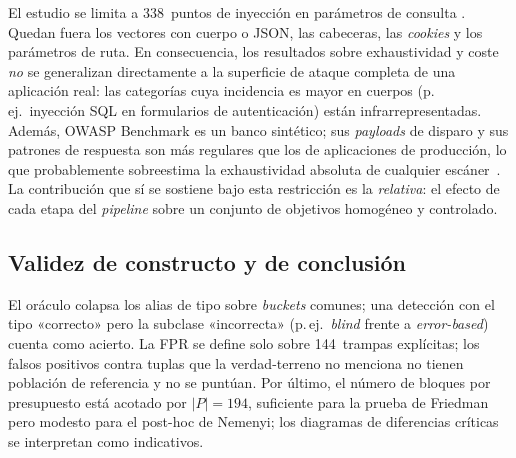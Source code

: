 El estudio se limita a \num{338}~puntos de inyección en parámetros de consulta
. Quedan fuera los vectores  con cuerpo
 o JSON, las cabeceras, las
\emph{cookies} y los parámetros de ruta. En consecuencia, los resultados sobre
exhaustividad y coste \emph{no} se generalizan directamente a la superficie de
ataque completa de una aplicación real: las categorías cuya incidencia es mayor
en cuerpos  (p.\,ej.\ inyección SQL en formularios de autenticación)
están infrarrepresentadas. Además, OWASP Benchmark es un banco sintético; sus
\emph{payloads} de disparo y sus patrones de respuesta son más regulares que
los de aplicaciones de producción, lo que probablemente sobreestima la
exhaustividad absoluta de cualquier escáner~\cite{doupe2010johnny}. La
contribución que sí se sostiene bajo esta restricción es la \emph{relativa}: el
efecto de cada etapa del \emph{pipeline} sobre un conjunto de objetivos
homogéneo y controlado.

\subsection{Validez de constructo y de conclusión}

El oráculo colapsa los alias de tipo sobre \emph{buckets} comunes; una
detección con el tipo «correcto» pero la subclase «incorrecta» (p.\,ej.\
\emph{blind} frente a \emph{error-based}) cuenta como acierto. La FPR se define
solo sobre \num{144}~trampas explícitas; los falsos positivos contra tuplas que
la verdad-terreno no menciona no tienen población de referencia y no se
puntúan. Por último, el número de bloques por presupuesto está acotado por
$\lvert P \rvert = 194$, suficiente para la prueba de Friedman pero modesto
para el post-hoc de Nemenyi; los diagramas de diferencias críticas se
interpretan como indicativos.
